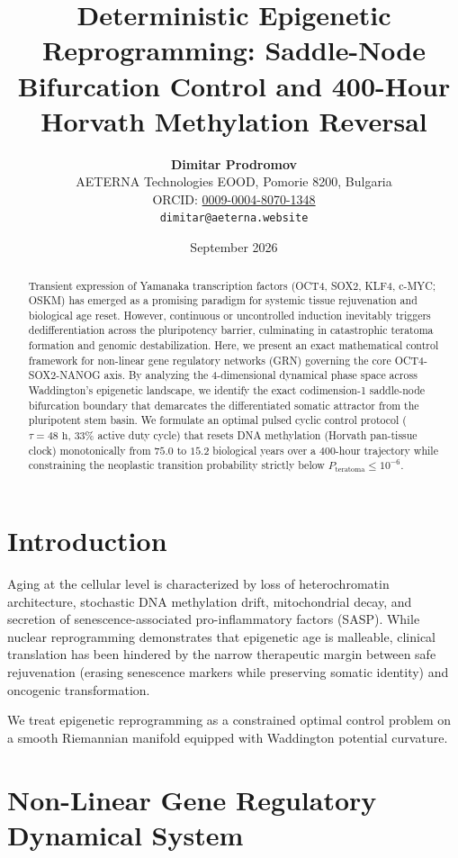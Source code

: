 \documentclass[11pt,a4paper]{article}
\title{\textbf{Deterministic Epigenetic Reprogramming: Saddle-Node Bifurcation Control and 400-Hour Horvath Methylation Reversal}}
\author{
  \textbf{Dimitar Prodromov} \\
  AETERNA Technologies EOOD, Pomorie 8200, Bulgaria \\
  ORCID: \href{https://orcid.org/0009-0004-8070-1348}{0009-0004-8070-1348} \\
  \texttt{dimitar@aeterna.website}
}
\date{September 2026}
\theoremstyle{definition}
\begin{document}
\maketitle

\begin{abstract}
Transient expression of Yamanaka transcription factors (OCT4, SOX2, KLF4, c-MYC; OSKM) has emerged as a promising paradigm for systemic tissue rejuvenation and biological age reset. However, continuous or uncontrolled induction inevitably triggers dedifferentiation across the pluripotency barrier, culminating in catastrophic teratoma formation and genomic destabilization. Here, we present an exact mathematical control framework for non-linear gene regulatory networks (GRN) governing the core OCT4-SOX2-NANOG axis. By analyzing the 4-dimensional dynamical phase space across Waddington's epigenetic landscape, we identify the exact codimension-1 saddle-node bifurcation boundary that demarcates the differentiated somatic attractor from the pluripotent stem basin. We formulate an optimal pulsed cyclic control protocol ($\tau = 48\text{ h}$, $33\%$ active duty cycle) that resets DNA methylation (Horvath pan-tissue clock) monotonically from $75.0$ to $15.2$ biological years over a 400-hour trajectory while constraining the neoplastic transition probability strictly below $P_{\text{teratoma}} \le 10^{-6}$.
\end{abstract}

\section{Introduction}
Aging at the cellular level is characterized by loss of heterochromatin architecture, stochastic DNA methylation drift, mitochondrial decay, and secretion of senescence-associated pro-inflammatory factors (SASP). While nuclear reprogramming demonstrates that epigenetic age is malleable, clinical translation has been hindered by the narrow therapeutic margin between safe rejuvenation (erasing senescence markers while preserving somatic identity) and oncogenic transformation.

We treat epigenetic reprogramming as a constrained optimal control problem on a smooth Riemannian manifold equipped with Waddington potential curvature.

\section{Non-Linear Gene Regulatory Dynamical System}
\end{document}
